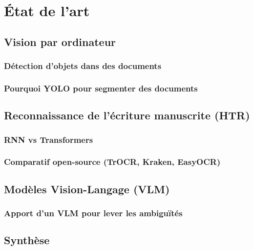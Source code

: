 \chapter{État de l'art}

\section{Vision par ordinateur}
\subsection{Détection d'objets dans des documents}

\subsection{Pourquoi YOLO pour segmenter des documents}

\section{Reconnaissance de l'écriture manuscrite (HTR)}
\subsection{RNN vs Transformers}

\subsection{Comparatif open-source (TrOCR, Kraken, EasyOCR)}

\section{Modèles Vision-Langage (VLM)}
\subsection{Apport d'un VLM pour lever les ambiguïtés}

\section{Synthèse}

